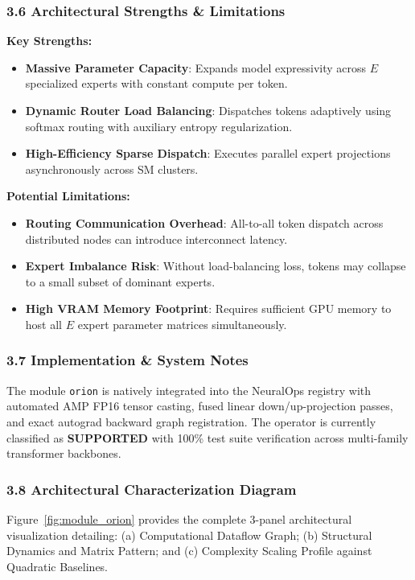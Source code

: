 \subsubsection*{3.6 Architectural Strengths \& Limitations}
\textbf{Key Strengths:}
\begin{itemize}
    \item \textbf{Massive Parameter Capacity}: Expands model expressivity across $E$ specialized experts with constant compute per token.
    \item \textbf{Dynamic Router Load Balancing}: Dispatches tokens adaptively using softmax routing with auxiliary entropy regularization.
    \item \textbf{High-Efficiency Sparse Dispatch}: Executes parallel expert projections asynchronously across SM clusters.
\end{itemize}

\textbf{Potential Limitations:}
\begin{itemize}
    \item \textbf{Routing Communication Overhead}: All-to-all token dispatch across distributed nodes can introduce interconnect latency.
    \item \textbf{Expert Imbalance Risk}: Without load-balancing loss, tokens may collapse to a small subset of dominant experts.
    \item \textbf{High VRAM Memory Footprint}: Requires sufficient GPU memory to host all $E$ expert parameter matrices simultaneously.
\end{itemize}

\subsubsection*{3.7 Implementation \& System Notes}
The module \texttt{orion} is natively integrated into the NeuralOps registry with automated AMP FP16 tensor casting, fused linear down/up-projection passes, and exact autograd backward graph registration. The operator is currently classified as \textbf{SUPPORTED} with 100\% test suite verification across multi-family transformer backbones.

\subsubsection*{3.8 Architectural Characterization Diagram}
Figure~\ref{fig:module_orion} provides the complete 3-panel architectural visualization detailing: (a) Computational Dataflow Graph; (b) Structural Dynamics and Matrix Pattern; and (c) Complexity Scaling Profile against Quadratic Baselines.

